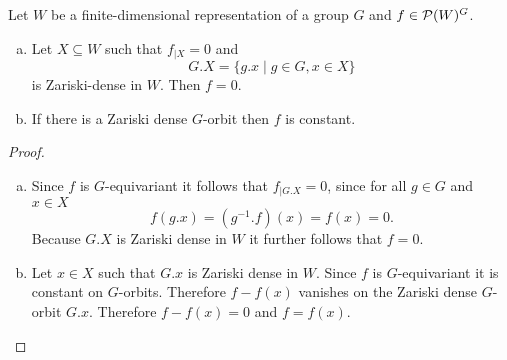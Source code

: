 \begin{lem}\label{lem: zariski density orbits}
 Let $W$ be a finite-dimensional representation of a group $G$ and $f \in \mathcal{P}(W)^G$.
 \begin{enumerate}[a)]
  \item
  Let $X \subseteq W$ such that $f_{|X} = 0$ and
  \[
   G.X = \{g.x \mid g \in G, x \in X\}
  \]
  is Zariski-dense in $W$. Then $f = 0$.
  \item
  If there is a Zariski dense $G$-orbit then $f$ is constant.
 \end{enumerate}
\end{lem}
\begin{proof}\leavevmode
 \begin{enumerate}[a)]
  \item
  Since $f$ is $G$-equivariant it follows that $f_{|G.X} = 0$, since for all $g \in G$ and $x \in X$
  \[
   f(g.x) = \left(g^{-1}.f\right)(x) = f(x) = 0.
  \]
  Because $G.X$ is Zariski dense in $W$ it further follows that $f = 0$.
  \item
  Let $x \in X$ such that $G.x$ is Zariski dense in $W$. Since $f$ is $G$-equivariant it is constant on $G$-orbits. Therefore $f-f(x)$ vanishes on the Zariski dense $G$-orbit $G.x$. Therefore $f-f(x) = 0$ and $f = f(x)$.
 \end{enumerate}
\end{proof}


